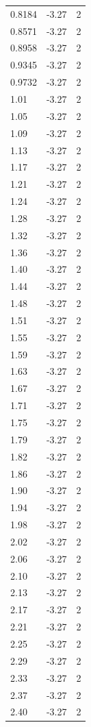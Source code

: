 \begin{longtable}{lrr}
  0.8184 & -3.27 & 2 \\
  0.8571 & -3.27 & 2 \\
  0.8958 & -3.27 & 2 \\
  0.9345 & -3.27 & 2 \\
  0.9732 & -3.27 & 2 \\
  1.01 & -3.27 & 2 \\
  1.05 & -3.27 & 2 \\
  1.09 & -3.27 & 2 \\
  1.13 & -3.27 & 2 \\
  1.17 & -3.27 & 2 \\
  1.21 & -3.27 & 2 \\
  1.24 & -3.27 & 2 \\
  1.28 & -3.27 & 2 \\
  1.32 & -3.27 & 2 \\
  1.36 & -3.27 & 2 \\
  1.40 & -3.27 & 2 \\
  1.44 & -3.27 & 2 \\
  1.48 & -3.27 & 2 \\
  1.51 & -3.27 & 2 \\
  1.55 & -3.27 & 2 \\
  1.59 & -3.27 & 2 \\
  1.63 & -3.27 & 2 \\
  1.67 & -3.27 & 2 \\
  1.71 & -3.27 & 2 \\
  1.75 & -3.27 & 2 \\
  1.79 & -3.27 & 2 \\
  1.82 & -3.27 & 2 \\
  1.86 & -3.27 & 2 \\
  1.90 & -3.27 & 2 \\
  1.94 & -3.27 & 2 \\
  1.98 & -3.27 & 2 \\
  2.02 & -3.27 & 2 \\
  2.06 & -3.27 & 2 \\
  2.10 & -3.27 & 2 \\
  2.13 & -3.27 & 2 \\
  2.17 & -3.27 & 2 \\
  2.21 & -3.27 & 2 \\
  2.25 & -3.27 & 2 \\
  2.29 & -3.27 & 2 \\
  2.33 & -3.27 & 2 \\
  2.37 & -3.27 & 2 \\
  2.40 & -3.27 & 2 \\

\end{longtable}
